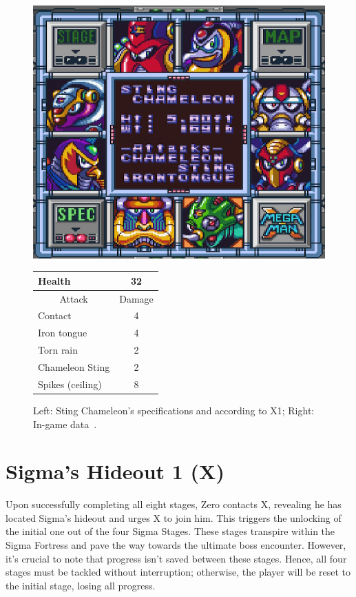 \begin{figure}[htp]
	\begin{minipage}[c]{0.45\linewidth}
		\vspace{0pt}
		\centering
		\includegraphics[width=\linewidth]{figures/X1/Sting_chameleon/Sting_chameleon_specs.png}
	\end{minipage}
	\begin{minipage}[c]{0.45\linewidth}
		\centering
		\vspace{0pt}
		\begin{tabular}[h]{l c}
			\toprule
			Health  & 32\\
			\midrule
			\multicolumn{1}{c}{Attack} & \multicolumn{1}{c}{Damage}\\
			Contact & 4\\
			Iron tongue & 4\\
			Torn rain & 2\\
			Chameleon Sting & 2\\
			Spikes (ceiling) & 8\\
			\bottomrule
		\end{tabular}
	\end{minipage}
	\caption{Left: Sting Chameleon's specifications and according to X1; Right: In-game data~\cite{wiki:Sting_chameleon}. }
	\label{Chameleon_specs}
\end{figure}

\section{Sigma's Hideout 1 (X)}
Upon successfully completing all eight stages, Zero contacts X, revealing he has located Sigma's hideout and urges X to join him. This triggers the unlocking of the initial one out of the four Sigma Stages. These stages transpire within the Sigma Fortress and pave the way towards the ultimate boss encounter. However, it's crucial to note that progress isn't saved between these stages. Hence, all four stages must be tackled without interruption; otherwise, the player will be reset to the initial stage, losing all progress.

